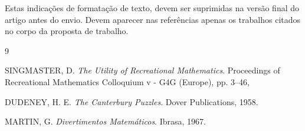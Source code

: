 \documentclass[12pt,oneside,a4paper]{article}
\begin{document}
 Estas indicações de formatação de texto,  devem ser suprimidas na versão final do artigo antes do envio. Devem aparecer nas referências apenas os trabalhos citados no corpo da proposta de trabalho. 


\renewcommand{\refname}{Bibliografia}
  \begin{thebibliography}{9}


      SINGMASTER, D. \emph{The Utility of Recreational Mathematics}.   Proceedings of Recreational Mathematics Colloquium v - G4G (Europe), pp. 3–46,
     
      DUDENEY, H. E. \emph{The Canterbury Puzzles}.   Dover Publications, 1958.
    
      MARTIN, G. \emph{Divertimentos Matemáticos}. Ibrasa, 1967.






 
\end{thebibliography}
\end{document}
